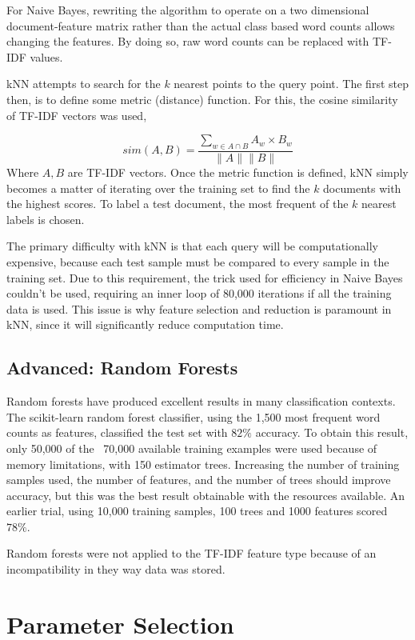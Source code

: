\documentclass[10pt,twocolumn]{article}
\begin{document}
For Naive Bayes, rewriting the algorithm to operate on a two dimensional document-feature matrix rather than the actual class based word counts allows changing the features. By doing so, raw word counts can be replaced with TF-IDF values. 

kNN attempts to search for the $k$ nearest points to the query point. The first step then, is to define some metric (distance) function. For this, the cosine similarity of TF-IDF vectors was used,

\[
sim(A,B) = \frac {\sum_{w \in A \cap B} A_w \times B_w} {\| A \| \| B \|}
\]
Where $A,B$ are TF-IDF vectors. Once the metric function is defined, kNN simply becomes a matter of iterating over the training set to find the $k$ documents with the highest scores. To label a test document, the most frequent of the $k$ nearest labels is chosen.

The primary difficulty with kNN is that each query will be computationally expensive, because each test sample must be compared to every sample in the training set. Due to this requirement, the trick used for efficiency in Naive Bayes couldn't be used, requiring an inner loop of 80,000 iterations if all the training data is used. This issue is why feature selection and reduction is paramount in kNN, since it will significantly reduce computation time.

\subsection*{Advanced: Random Forests}

Random forests have produced excellent results in many classification contexts. The scikit-learn random forest classifier, using the 1,500 most frequent word counts as features, classified the test set with $82\%$ accuracy. To obtain this result, only 50,000 of the ~70,000 available training examples were used because of memory limitations, with 150 estimator trees.  Increasing the number of training samples used, the number of features, and the number of trees should improve accuracy, but this was the best result obtainable with the resources available.  An earlier trial, using 10,000 training samples, 100 trees and 1000 features scored $78\%$.

Random forests were not applied to the TF-IDF feature type because of an incompatibility in they way data was stored.

\section*{Parameter Selection}
\end{document}
